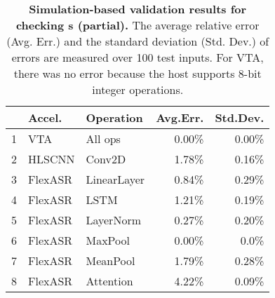 \begin{table}
\caption{
\textbf{
Simulation-based validation results for checking {\mapping}s (partial).
}
The average relative error (Avg. Err.) and the standard deviation (Std. Dev.) of errors are measured 
over 100 test inputs. %
For VTA, 
there was no error because the host supports 
8-bit integer operations.
}
\label{tab.layer-sim}
\centering
\begin{small}
\begin{tabular}{|c|l|l|r|r|}
\hline
  & Accel. & Operation & Avg.Err. & Std.Dev.  \\
  \hline \hline
  1 & VTA & All ops & 0.00\% & 0.00\% \\ %
  2 & HLSCNN & Conv2D & 1.78\% & 0.16\% \\ %
  3 & FlexASR & LinearLayer & 0.84\% & 0.29\% \\ %
  4 & FlexASR & LSTM & 1.21\% & 0.19\% \\ %
  5 & FlexASR & LayerNorm & 0.27\% & 0.20\% \\ %
  6 & FlexASR & MaxPool & 0.00\% & 0.0\% \\ %
  7 & FlexASR & MeanPool & 1.79\% & 0.28\% \\ %
  8 & FlexASR & Attention & 4.22\% & 0.09\% \\ 
\hline
\end{tabular}
\end{small}
\end{table}